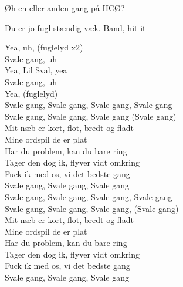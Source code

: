 \documentclass[a4paper,11pt]{article}
\begin{document}
\begin{sketch}
 Øh en eller anden gang på HCØ?

 Du er jo fugl-stændig væk. Band, hit it


 Yea, uh, (fuglelyd x2) \\
Svale gang, uh \\
Yea, Lil Sval, yea \\
Svale gang, uh \\
Yea, (fuglelyd) \\

 Svale gang, Svale gang, Svale gang, Svale gang \\
Svale gang, Svale gang, Svale gang (Svale gang) \\
Mit næb er kort, flot, bredt og fladt \\
Mine ordspil de er plat \\
Har du problem, kan du bare ring \\
Tager den dog ik, flyver vidt omkring \\
Fuck ik med os, vi det bedste gang \\
Svale gang, Svale gang, Svale gang \\

\noindent Svale gang, Svale gang, Svale gang, Svale gang \\
Svale gang, Svale gang, Svale gang, (Svale gang) \\
Mit næb er kort, flot, bredt og fladt \\
Mine ordspil de er plat \\
Har du problem, kan du bare ring \\
Tager den dog ik, flyver vidt omkring \\
Fuck ik med os, vi det bedste gang \\
Svale gang, Svale gang, Svale gang

\end{sketch}
\end{document}

